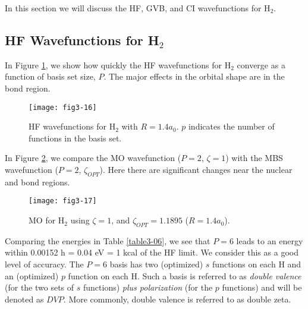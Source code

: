In this section we will discuss the HF, GVB, 
and CI wavefunctions for H$_2$.

\subsection{HF Wavefunctions for H$_2$}

In Figure \ref{fig3-17}, we show how quickly the HF
wavefunctions for H$_2$ converge as a function of basis set size, $P$.
The major effects in the orbital shape are in the bond region.

\begin{figure}
\texttt{[image: fig3-16]}
\caption{HF wavefunctions for H$_2$ with $R = 1.4a_0$. $p$
indicates the number of functions in the basis set.}
\label{fig3-17}
\end{figure}

In Figure \ref{fig3-18}, we compare the MO wavefunction ($P = 2$,
$\zeta = 1$) with the MBS wavefunction ($P =2$, $\zeta_{OPT}$).  Here
there are significant changes near the nuclear and bond regions.

\begin{figure}
\texttt{[image: fig3-17]}
\caption{MO for H$_2$ using $\zeta = 1$, and $\zeta_{OPT} = 1.1895$ 
($R = 1.4a_0$).} 
\label{fig3-18}
\end{figure}

Comparing the energies in Table \ref{table3-06}, we see that $P = 6$
leads to an energy within 0.00152 h = 0.04 eV = 1 kcal of the HF
limit.  We consider this as a good level of accuracy.  The $P = 6$
basis has two (optimized) $s$ functions on each H and an (optimized)
$p$ function on each H.  Such a basis is referred to as \emph{double
valence} (for the two sets of $s$ functions) \emph{plus polarization}
(for the $p$ functions) and will be denoted as $DVP$.  More
commonly, double valence is referred to as double zeta.

